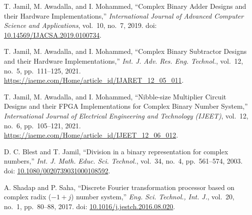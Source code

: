 \documentclass[10pt,a4paper,notitlepage]{report}
\begin{document}
\begin{thebibliography}{0}
T. Jamil, M. Awadalla, and I. Mohammed,
``Complex Binary Adder Designs and their Hardware Implementations,''
\textit{International Journal of Advanced Computer Science and Applications},
vol.~10, no.~7, 2019.
doi: \href{http://dx.doi.org/10.14569/IJACSA.2019.0100734}{10.14569/IJACSA.2019.0100734}.

T. Jamil, M. Awadalla, and I. Mohammed,
``Complex Binary Subtractor Designs and their Hardware Implementations,''
\textit{Int. J. Adv. Res. Eng. Technol.},
vol.~12, no.~5, pp.~111--125, 2021.
\url{https://iaeme.com/Home/article_id/IJARET_12_05_011}.

T. Jamil, M. Awadalla, and I. Mohammed,
``Nibble-size Multiplier Circuit Designs and their FPGA Implementations for Complex Binary Number System,''
\textit{International Journal of Electrical Engineering and Technology (IJEET)},
vol.~12, no.~6, pp.~105--121, 2021.
\url{https://iaeme.com/Home/article_id/IJEET_12_06_012}.

D. C. Blest and T. Jamil,
``Division in a binary representation for complex numbers,''
\textit{Int. J. Math. Educ. Sci. Technol.},
vol.~34, no.~4, pp.~561--574, 2003.
doi: \href{https://doi.org/10.1080/0020739031000108592}{10.1080/0020739031000108592}.

A. Shadap and P. Saha,
``Discrete Fourier transformation processor based on complex radix ($-1+j$) number system,''
\textit{Eng. Sci. Technol., Int. J.},
vol.~20, no.~1, pp.~80--88, 2017.
doi: \href{https://doi.org/10.1016/j.jestch.2016.08.020}{10.1016/j.jestch.2016.08.020}.

\end{thebibliography}
\end{document}
